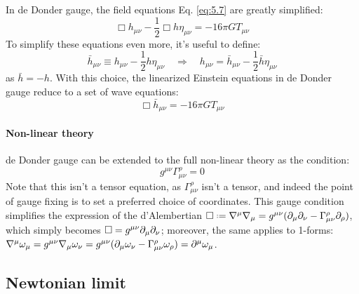 In de Donder gauge, the field equations Eq. \ref{eq:5.7} are greatly simplified:
\begin{equation}
  \Box h_{\mu \nu} - \frac{1}{2} \Box h \eta_{\mu \nu} = -16\pi G T_{\mu \nu}
  \label{eq:5.11}
\end{equation}
To simplify these equations even more, it's useful to define:
\begin{equation*}
  \bar{h}_{\mu \nu} \equiv h_{\mu \nu} - \frac{1}{2} h \eta_{\mu \nu}
  \quad \Rightarrow \quad
  h_{\mu \nu} = \bar{h}_{\mu \nu} - \frac{1}{2} \bar{h} \eta_{\mu \nu}
\end{equation*}
as $ \bar{h} = - h $. With this choice, the linearized Einstein equations in de Donder gauge reduce to a set of wave equations:
\begin{equation}
  \Box \bar{h}_{\mu \nu} = -16\pi G T_{\mu \nu}
  \label{eq:5.12}
\end{equation}

\paragraph{Non-linear theory}

de Donder gauge can be extended to the full non-linear theory as the condition:
\begin{equation}
  g^{\mu \nu} \Gamma^\rho_{\mu \nu} = 0
  \label{eq:5.13}
\end{equation}
Note that this isn't a tensor equation, as $ \Gamma^\rho_{\mu \nu} $ isn't a tensor, and indeed the point of gauge fixing is to set a preferred choice of coordinates. This gauge condition simplifies the expression of the d'Alembertian $ \Box \defeq \na^\mu \na_\mu = g^{\mu \nu} ( \pa_\mu \pa_\nu - \Gamma^\rho_{\mu \nu} \pa_\rho ) $, which simply becomes $ \Box = g^{\mu \nu} \partial_\mu \partial_\nu $; moreover, the same applies to 1-forms: $ \nabla^\mu \omega_\mu = g^{\mu \nu} \nabla_\mu \omega_\nu = g^{\mu \nu} ( \partial_\mu \omega _\nu - \Gamma^\rho_{\mu \nu} \omega_\rho ) = \partial^\mu \omega_\mu $.

\subsection{Newtonian limit}


